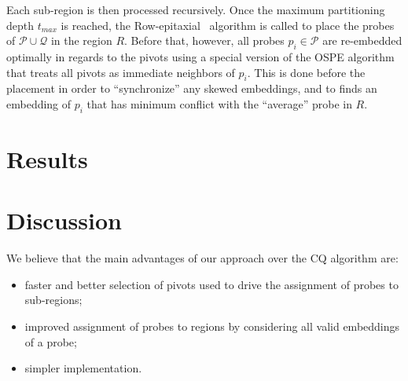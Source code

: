 \documentclass[runningheads]{llncs}
\newcommand{\ignore}[1]{}
\begin{document}
Each sub-region is then processed recursively. Once the maximum partitioning depth
$t_{max}$ is reached, the Row-epitaxial~\cite{KAHNG03A} algorithm is
called to place the probes of $\mathcal{P} \cup \mathcal{Q}$ in the region $R$.
Before that, however, all probes $p_i \in \mathcal{P}$ are re-embedded optimally
in regards to the pivots using a special version of the OSPE algorithm that treats
all pivots as immediate neighbors of $p_i$. This is done before the placement in
order to ``synchronize'' any skewed embeddings, and to finds an embedding of
$p_i$ that has minimum conflict with the ``average'' probe in $R$.

\section{Results}
\label{sec:results}

\ignore{Their results show that the running time of the Row-epitaxial algorithm
drops significantly with increasing recursion depth. The time required to place
the probes of a 500\,x\,500 chip, for instance, dropped by 69\% with $L = 3$ when
compared with the time required by the Row-epitaxial without any partitioning.

It is not clear from their experiments, however, how the choice of $L$ impaired
the performance of the Row-epitaxial algorithm in terms of solution quality since
they have restricted their experiments to $L \leq 3$. Moreover, there is no clear
trend toward reduction or increase in border length as $L$ varies from~0 to~3.}

\section{Discussion}
\label{sec:discuss}

We believe that the main advantages of our
approach over the CQ algorithm are:

\begin{itemize}
\item faster and better selection of pivots used to drive
the assignment of probes to sub-regions;
\item improved assignment of probes to regions by considering all valid embeddings
of a probe;
\item simpler implementation.
\end{itemize}
\end{document}
